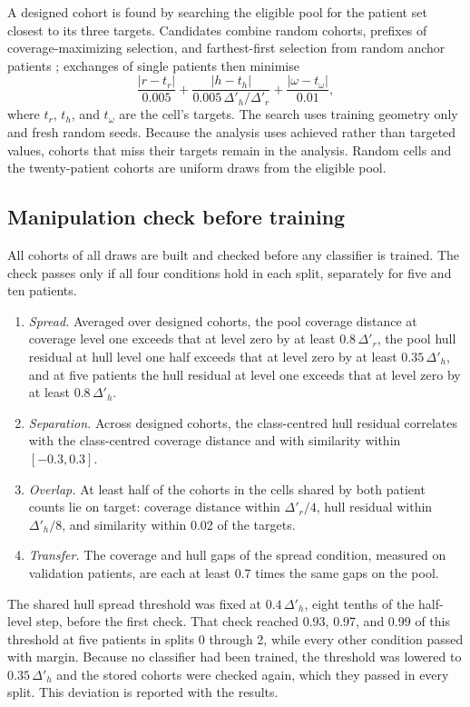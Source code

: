 \documentclass[11pt]{article}
\begin{document}
A designed cohort is found by searching the eligible pool for the patient set closest to its three targets. Candidates combine random cohorts, prefixes of coverage-maximizing selection, and farthest-first selection from random anchor patients \citep{queisler2026coverageSimilarity}; exchanges of single patients then minimise
\begin{equation}
 \frac{|r-t_r|}{0.005}+\frac{|h-t_h|}{0.005\,\Delta'_h/\Delta'_r}+\frac{|\omega-t_\omega|}{0.01},
 \label{eq:loss}
\end{equation}
\noindent where $t_r$, $t_h$, and $t_\omega$ are the cell's targets. The search uses training geometry only and fresh random seeds. Because the analysis uses achieved rather than targeted values, cohorts that miss their targets remain in the analysis. Random cells and the twenty-patient cohorts are uniform draws from the eligible pool.

\subsection{Manipulation check before training}
\label{sec:check}
All cohorts of all draws are built and checked before any classifier is trained. The check passes only if all four conditions hold in each split, separately for five and ten patients.
\begin{enumerate}
 \item \emph{Spread.} Averaged over designed cohorts, the pool coverage distance at coverage level one exceeds that at level zero by at least $0.8\,\Delta'_r$, the pool hull residual at hull level one half exceeds that at level zero by at least $0.35\,\Delta'_h$, and at five patients the hull residual at level one exceeds that at level zero by at least $0.8\,\Delta'_h$.
 \item \emph{Separation.} Across designed cohorts, the class-centred hull residual correlates with the class-centred coverage distance and with similarity within $[-0.3,0.3]$.
 \item \emph{Overlap.} At least half of the cohorts in the cells shared by both patient counts lie on target: coverage distance within $\Delta'_r/4$, hull residual within $\Delta'_h/8$, and similarity within 0.02 of the targets.
 \item \emph{Transfer.} The coverage and hull gaps of the spread condition, measured on validation patients, are each at least 0.7 times the same gaps on the pool.
\end{enumerate}
\noindent The shared hull spread threshold was fixed at $0.4\,\Delta'_h$, eight tenths of the half-level step, before the first check. That check reached 0.93, 0.97, and 0.99 of this threshold at five patients in splits 0 through 2, while every other condition passed with margin. Because no classifier had been trained, the threshold was lowered to $0.35\,\Delta'_h$ and the stored cohorts were checked again, which they passed in every split. This deviation is reported with the results.
\end{document}
